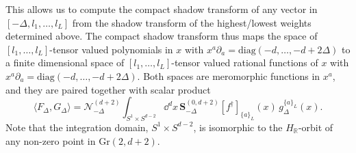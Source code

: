 \documentclass{article}
\def \Dg {\Delta}
\def \ds {\partial}
\def \Rs {\mathbb{R}}
\begin{document}
     This allows us to compute the compact shadow transform of any vector in $[-\Dg,l_1,\dots,l_L]$ from the shadow transform of the highest/lowest weights determined above. The compact shadow transform thus maps the space of $[l_1,\dots,l_L]$-tensor valued polynomials in $x$ with $x^a \ds_a = \mathrm{diag}(-d,\dots,-d+2\Dg)$ to a finite dimensional space of $[l_1,\dots,l_L]$-tensor valued rational functions of $x$ with $x^a \ds_a = \mathrm{diag}(-d,\dots,-d+2\Dg)$. Both spaces are meromorphic functions in $x^a$, and they are paired together with scalar product 
     \begin{equation}
         \langle F_{\Dg}, G_{\Dg}\rangle = \mathcal{N}_{-\Dg}^{(d+2)}\int_{S^1 \times S^{d-2}} \dd^d x\, \mathbf{S}^{(0,d+2)}_{-\Dg}[f^{\dagger}]_{\{a\}_L}(x)\, g_{\Dg}^{\{a\}_L}(x).
     \end{equation}
     Note that the integration domain, $S^1 \times S^{d-2}$, is isomorphic to the $H_{\Rs}$-orbit of any non-zero point in $\mathrm{Gr}(2,d+2)$.        
    
\end{document}
